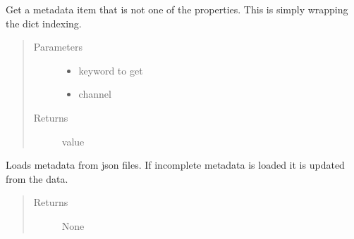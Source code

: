 \documentclass[letterpaper,10pt,english]{sphinxmanual}
\begin{document}
\begin{fulllineitems}

\begin{fulllineitems}
\label{\detokenize{autodocs/data:listmode.data.Metadata.get}}
\sphinxAtStartPar
Get a metadata item that is not one of the properties. This is simply wrapping the dict indexing.
\begin{quote}\begin{description}
\item[{Parameters}] \leavevmode\begin{itemize}
\item {} 
\sphinxAtStartPar
{} \textendash{} keyword to get

\item {} 
\sphinxAtStartPar
{} \textendash{} channel

\end{itemize}

\item[{Returns}] \leavevmode
\sphinxAtStartPar
value

\end{description}\end{quote}

\end{fulllineitems}


\begin{fulllineitems}
\label{\detokenize{autodocs/data:listmode.data.Metadata.input_counts}}
\end{fulllineitems}


\begin{fulllineitems}
\label{\detokenize{autodocs/data:listmode.data.Metadata.load}}
\sphinxAtStartPar
Loads metadata from json files. If incomplete metadata is loaded it is updated from the data.
\begin{quote}\begin{description}
\item[{Returns}] \leavevmode
\sphinxAtStartPar
None


\end{description}
\end{quote}
\end{fulllineitems}
\end{fulllineitems}
\end{document}
